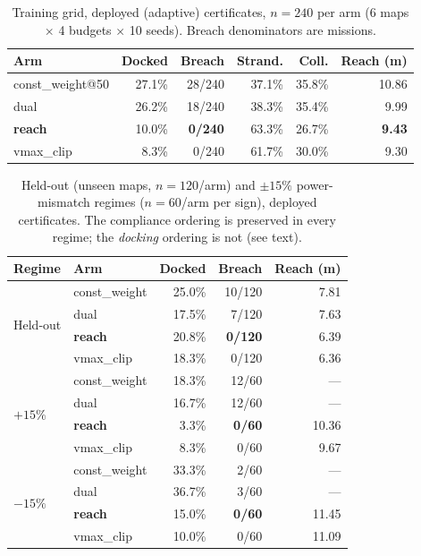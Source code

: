 \documentclass[preprint,12pt]{elsarticle}
\begin{document}
\begin{table}[!t]
\caption{Training grid, deployed (adaptive) certificates, $n = 240$
per arm (6 maps $\times$ 4 budgets $\times$ 10 seeds). Breach
denominators are missions.}
\label{tab:main}
\centering
\small
\setlength{\tabcolsep}{4pt}
\begin{tabular}{lrrrrr}
\toprule
Arm & Docked & Breach & Strand. & Coll. & Reach (m)\\
\midrule
const\_weight@50 & 27.1\% & 28/240 & 37.1\% & 35.8\% & 10.86\\
dual & 26.2\% & 18/240 & 38.3\% & 35.4\% & 9.99\\
\textbf{reach} & 10.0\% & \textbf{0/240} & 63.3\% & 26.7\% & \textbf{9.43}\\
vmax\_clip & 8.3\% & 0/240 & 61.7\% & 30.0\% & 9.30\\
\bottomrule
\end{tabular}
\end{table}

\begin{table}[!t]
\caption{Held-out (unseen maps, $n = 120$/arm) and $\pm 15\%$
power-mismatch regimes ($n = 60$/arm per sign), deployed
certificates. The compliance ordering is preserved in every regime;
the \emph{docking} ordering is not (see text).}
\label{tab:heldout}
\centering
\small
\begin{tabular}{llrrr}
\toprule
Regime & Arm & Docked & Breach & Reach (m)\\
\midrule
\multirow{4}{*}{Held-out}
 & const\_weight & 25.0\% & 10/120 & 7.81\\
 & dual & 17.5\% & 7/120 & 7.63\\
 & \textbf{reach} & 20.8\% & \textbf{0/120} & 6.39\\
 & vmax\_clip & 18.3\% & 0/120 & 6.36\\
\midrule
\multirow{4}{*}{$+15\%$}
 & const\_weight & 18.3\% & 12/60 & ---\\
 & dual & 16.7\% & 12/60 & ---\\
 & \textbf{reach} & 3.3\% & \textbf{0/60} & 10.36\\
 & vmax\_clip & 8.3\% & 0/60 & 9.67\\
\midrule
\multirow{4}{*}{$-15\%$}
 & const\_weight & 33.3\% & 2/60 & ---\\
 & dual & 36.7\% & 3/60 & ---\\
 & \textbf{reach} & 15.0\% & \textbf{0/60} & 11.45\\
 & vmax\_clip & 10.0\% & 0/60 & 11.09\\
\bottomrule
\end{tabular}
\end{table}
\end{document}
